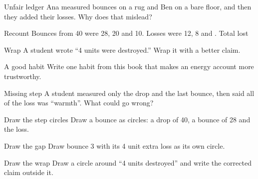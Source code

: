 \begin{puzzle}{Unfair ledger}
Ana measured bounces on a rug and Ben on a bare floor, and then they added their losses. Why does that mislead? \wline[6cm]
\end{puzzle}

\clearpage

\begin{puzzle}{Recount}
Bounces from 40 were 28, 20 and 10. Losses were 12, 8 and \wline[1.2cm]. Total lost \wline[1.2cm]
\end{puzzle}

\begin{puzzle}{Wrap}
A student wrote ``4 units were destroyed.'' Wrap it with a better claim. \wline[6cm]
\end{puzzle}

\begin{puzzle}{A good habit}
Write one habit from this book that makes an energy account more trustworthy. \wline[6cm]
\end{puzzle}

\begin{puzzle}{Missing step}
A student measured only the drop and the last bounce, then said all of the loss was ``warmth''. What could go wrong? \wline[6cm]
\end{puzzle}

\clearpage

\begin{puzzle}{Draw the step circles}
Draw a bounce as circles: a drop of 40, a bounce of 28 and the loss.
\begin{center}\end{center}
\end{puzzle}

\begin{puzzle}{Draw the gap}
Draw bounce 3 with its 4 unit extra loss as its own circle.
\begin{center}\end{center}
\end{puzzle}

\begin{puzzle}{Draw the wrap}
Draw a circle around ``4 units destroyed'' and write the corrected claim outside it.
\begin{center}\end{center}
\end{puzzle}

